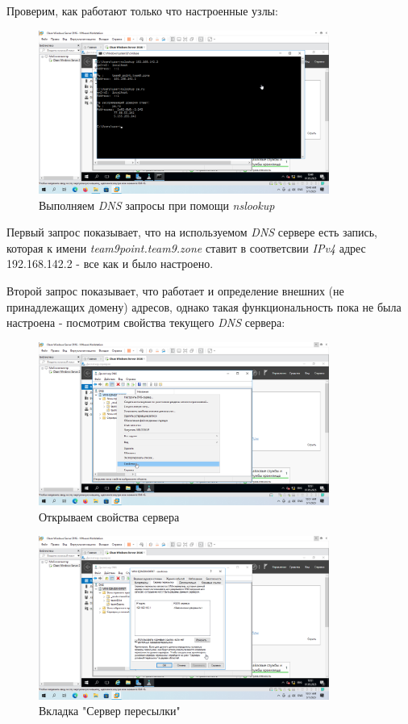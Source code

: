 \documentclass[a4paper]{article}
\begin{document}
  Проверим, как работают только что настроенные узлы:

  \begin{figure}[H]
    \centering
    \includegraphics[width=0.85\textwidth]{9_0090}
    \caption{Выполняем \textit{DNS} запросы при помощи \textit{nslookup}}
    \label{img:0090}
  \end{figure}

  Первый запрос показывает, что на используемом \textit{DNS} сервере есть
  запись, которая к имени \textit{team9\textunderscore point.team9.zone} ставит в 
  соответсвии \textit{IPv4} адрес 192.168.142.2 - все как и было настроено.

  Второй запрос показывает, что работает и определение внешних (не принадлежащих
  домену) адресов, однако такая функциональность пока не была настроена -
  посмотрим свойства текущего \textit{DNS} сервера:

  \begin{figure}[H]
    \centering
    \includegraphics[width=0.85\textwidth]{9_0093}
    \caption{Открываем свойства сервера}
    \label{img:0093}
  \end{figure}

  \begin{figure}[H]
    \centering
    \includegraphics[width=0.85\textwidth]{9_0094}
    \caption{Вкладка "Сервер пересылки"}
    \label{img:0094}
  \end{figure}
\end{document}
